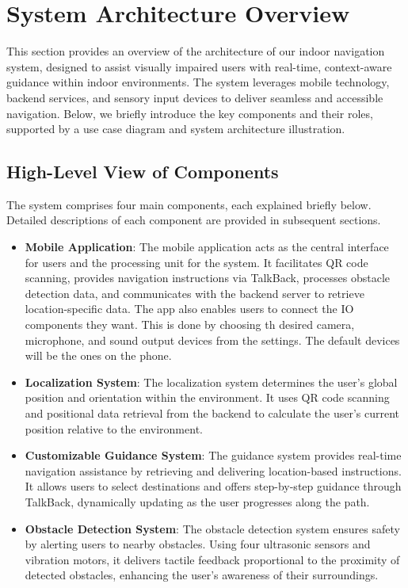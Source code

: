 \section{System Architecture Overview}

This section provides an overview of the architecture of our indoor navigation system, designed to assist visually impaired users with real-time, context-aware guidance within indoor environments. The system leverages mobile technology, backend services, and sensory input devices to deliver seamless and accessible navigation. Below, we briefly introduce the key components and their roles, supported by a use case diagram and system architecture illustration.

\subsection{High-Level View of Components}

The system comprises four main components, each explained briefly below. Detailed descriptions of each component are provided in subsequent sections.

\begin{itemize}
	\item \textbf{Mobile Application}: The mobile application acts as the central interface for users and the processing unit for the system. It facilitates QR code scanning, provides navigation instructions via TalkBack, processes obstacle detection data, and communicates with the backend server to retrieve location-specific data. The app also enables users to connect the IO components they want. This is done by choosing th desired camera, microphone, and sound output devices from the settings. The default devices will be the ones on the phone.
	
	\item \textbf{Localization System}: The localization system determines the user’s global position and orientation within the environment. It uses QR code scanning and positional data retrieval from the backend to calculate the user’s current position relative to the environment.
	
	\item \textbf{Customizable Guidance System}: The guidance system provides real-time navigation assistance by retrieving and delivering location-based instructions. It allows users to select destinations and offers step-by-step guidance through TalkBack, dynamically updating as the user progresses along the path.
	
	\item \textbf{Obstacle Detection System}: The obstacle detection system ensures safety by alerting users to nearby obstacles. Using four ultrasonic sensors and vibration motors, it delivers tactile feedback proportional to the proximity of detected obstacles, enhancing the user's awareness of their surroundings.
\end{itemize}

